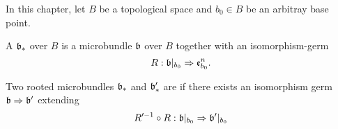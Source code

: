 In this chapter, let $B$ be a topological space and $b_0 \in B$ be an arbitray base point.
\begin{mydefinition}
    A  $\mathfrak{b}_*$ over $B$ is a microbundle $\mathfrak{b}$ over $B$ together with an isomorphism-germ
    \[ R: \mathfrak{b}\vert_{b_0} \Rightarrow{} \mathfrak{e}^n_{b_0}. \]

    Two rooted microbundles $\mathfrak{b}_*$ and $\mathfrak{b}'_*$ are  if there exists an isomorphism germ $\mathfrak{b} \Rightarrow{} \mathfrak{b}'$ extending
    \[ R'^{-1} \circ R: \mathfrak{b}\vert_{b_0} \Rightarrow{} \mathfrak{b}'\vert_{b_0} \]
\end{mydefinition}

